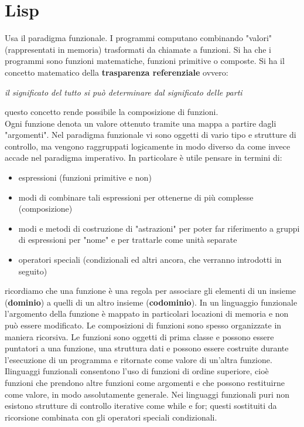 \documentclass[a4paper,12pt, oneside]{book}
\begin{document}
\chapter{Lisp}
Usa il paradigma funzionale. I programmi computano combinando "valori" (rappresentati in memoria) trasformati da chiamate a funzioni. Si ha che i programmi sono funzioni matematiche, funzioni primitive o composte. Si ha il concetto matematico della \textbf{trasparenza referenziale} ovvero:
\begin{center}
	\textit{il significato del tutto si può determinare dal significato delle parti}
\end{center}
questo concetto rende possibile la composizione di funzioni.\\
Ogni funzione denota un valore ottenuto tramite una mappa a
partire dagli "argomenti". Nel paradigma funzionale vi sono oggetti di vario tipo e strutture di controllo, ma vengono raggruppati logicamente in modo
diverso da come invece accade nel paradigma imperativo. In
particolare è utile pensare in termini di:
\begin{itemize}
	\item espressioni (funzioni primitive e non)
	\item modi di combinare tali espressioni per ottenerne di più
	      complesse (composizione)
	\item modi e metodi di costruzione di "astrazioni" per poter far
	      riferimento a gruppi di espressioni per "nome" e per trattarle
	      come unità separate
	\item operatori speciali (condizionali ed altri ancora, che verranno
	      introdotti in seguito)
\end{itemize}
ricordiamo che una funzione è una regola per associare gli elementi di un insieme (\textbf{dominio}) a quelli di un altro insieme (\textbf{codominio}). In un linguaggio funzionale l'argomento della funzione è mappato in particolari locazioni di memoria e non può essere modificato. Le composizioni di funzioni sono spesso organizzate in maniera ricorsiva. Le funzioni sono oggetti di prima classe e possono essere puntatori a una funzione, una struttura dati e possono essere costruite durante l'esecuzione di un programma e ritornate come valore di un'altra funzione. Ilinguaggi funzionali consentono l'uso di funzioni di ordine superiore, cioè funzioni che prendono altre funzioni come argomenti e che possono restituirne come valore, in modo assolutamente generale. Nei linguaggi funzionali puri non esistono strutture di controllo iterative come while e for; questi sostituiti da ricorsione combinata con gli operatori speciali condizionali.\\
\end{document}
